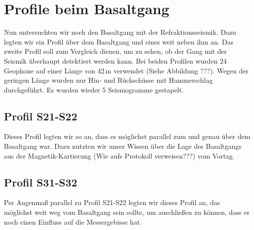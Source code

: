 \section{Profile beim Basaltgang}

Nun untersuchten wir noch den Basaltgang mit der Refraktionsseismik. Dazu legten wir ein Profil über dem Basaltgang und eines weit neben ihm an. Das zweite Profil soll zum Vergleich dienen, um zu sehen, ob der Gang mit der Seismik überhaupt detektiert werden kann. Bei beiden Profilen wurden 24 Geophone auf einer Länge von 42\,m verwendet (Siehe Abbildung ???). Wegen der geringen Länge wurden nur Hin- und Rückschüsse mit Hammerschlag durchgeführt. Es wurden wieder 5 Seismogramme gestapelt.

\subsection{Profil S21-S22}

Dieses Profil legten wir so an, dass es möglichst parallel zum und genau über dem Basaltgang war. Dazu nutzten wir unser Wissen über die Lage des Basaltgangs aus der Magnetik-Kartierung (Wie aufs Protokoll verweisen???) vom Vortag.

\subsection{Profil S31-S32}

Per Augenmaß parallel zu Profil S21-S22 legten wir dieses Profil an, das möglichst weit weg vom Basaltgang sein sollte, um auschließen zu können, dass er noch einen Einfluss auf die Messergebisse hat.